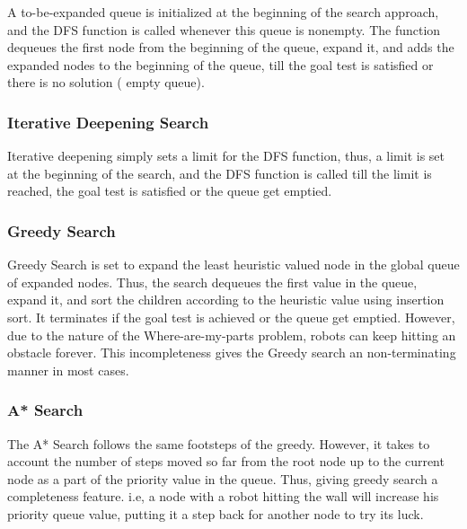 A to-be-expanded queue is initialized at the beginning of the search approach, and the DFS function is called whenever this queue is nonempty. The function dequeues the first node from the beginning of the queue, expand it, and adds the expanded nodes to the beginning of the queue, till the goal test is satisfied or there is no solution ( empty queue). 


\subsubsection{Iterative Deepening Search}

Iterative deepening simply sets a limit for the DFS function, thus, a limit is set at the beginning of the search, and the DFS function is called till the limit is reached, the goal test is satisfied or the queue get emptied.

\subsubsection{Greedy Search}
Greedy Search is set to expand the least heuristic valued node in the global queue of expanded nodes. Thus, the search dequeues the first value in the queue, expand it, and sort the children according to the heuristic value using insertion sort. It terminates if the goal test is achieved or the queue get emptied. However, due to the nature of the Where-are-my-parts problem, robots can keep hitting an obstacle forever. This incompleteness gives the Greedy search an non-terminating manner in most cases.

\subsubsection{A* Search}
The A* Search follows the same footsteps of the greedy. However, it takes to account the number of steps moved so far from the root node up to the current node as a part of the priority value in the queue. Thus, giving greedy search a completeness feature. i.e, a node with a robot hitting the wall will increase his priority queue value, putting it a step back for another node to try its luck.

\newpage
